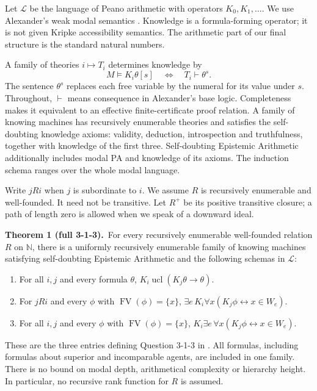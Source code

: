 \documentclass[11pt]{article}
\newcommand{\N}{\mathbb N}
\newcommand{\FV}{\operatorname{FV}}
\newcommand{\ucl}{\operatorname{ucl}}
\newcommand{\statement}[2]{\par\textbf{#1.}\ #2\par}
\begin{document}
Let $\mathcal L$ be the language of Peano arithmetic with operators
$K_0,K_1,\ldots$. We use Alexander's weak modal semantics
\cite[\S\S1.2--1.3]{Alexander}. Knowledge is a formula-forming operator;
it is not given Kripke accessibility semantics. The arithmetic part of
our final structure is the standard natural numbers.

A family of theories $i\mapsto T_i$ determines knowledge by
\begin{equation}\label{eq:actual-semantics}
  M\models K_i\theta[s]\quad\Longleftrightarrow\quad
  T_i\vdash\theta^s.
\end{equation}
The sentence $\theta^s$ replaces each free variable by the numeral for
its value under $s$. Throughout, $\vdash$ means consequence in
Alexander's base logic. Completeness makes it equivalent to an
effective finite-certificate proof relation. A family of knowing
machines has recursively enumerable theories and satisfies the
self-doubting knowledge axioms: validity, deduction, introspection and
truthfulness, together with knowledge of the first three. Self-doubting
Epistemic Arithmetic additionally includes modal PA and knowledge of
its axioms. The induction schema ranges over the whole modal language.

Write $jRi$ when $j$ is subordinate to $i$. We assume $R$ is recursively
enumerable and well-founded. It need not be transitive. Let $R^+$ be its
positive transitive closure; a path of length zero is allowed when we
speak of a downward ideal.

\statement{Theorem 1 (full 3-1-3)}{For every recursively enumerable
well-founded relation $R$ on $\N$, there is a uniformly recursively
enumerable family of knowing machines satisfying self-doubting
Epistemic Arithmetic and the following schemas in $\mathcal L$:}
\begin{enumerate}
\item For all $i,j$ and every formula $\theta$,
  $K_i\ucl(K_j\theta\to\theta)$.
\item For $jRi$ and every $\phi$ with $\FV(\phi)=\{x\}$,
  $\exists e\,K_i\forall x(K_j\phi\leftrightarrow x\in W_e)$.
\item For all $i,j$ and every $\phi$ with $\FV(\phi)=\{x\}$,
  $K_i\exists e\,\forall x(K_j\phi\leftrightarrow x\in W_e)$.
\end{enumerate}

These are the three entries defining Question 3-1-3 in
\cite[Definition 1.1.1]{Alexander}. All formulas, including formulas
about superior and incomparable agents, are included in one family.
There is no bound on modal depth, arithmetical complexity or hierarchy
height. In particular, no recursive rank function for $R$ is assumed.
\end{document}
